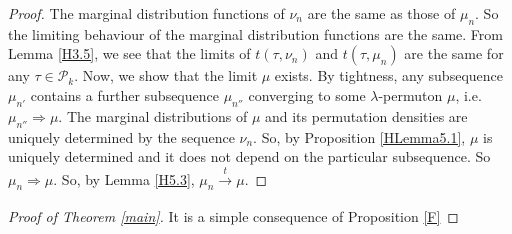 \documentclass[12pt,twoside]{article}
\theoremstyle{definition}
\theoremstyle{remark}
\numberwithin{equation}{section}
\theoremstyle{plain}
\theoremstyle{remark}
\def\PD{{\mathcal P}}                     \def\PDW{{\tilde{\cal P}}}
\def\PD{{\mathcal P}}
\begin{document}
\begin{proof}
The marginal distribution functions of $\nu_n$ are the same as those of $\mu_n$.
So the limiting behaviour of the marginal distribution functions are the same.
From Lemma \ref{H3.5}, we see that the limits of
$t(\tau, \nu_n)$ and  $t(\tau, \mu_n)$ are the same for any $\tau\in \PD_{k}$.
Now, we show that the limit $\mu$ exists.
By tightness, any subsequence $\mu_{n'} $ contains a further subsequence 
$\mu_{n''} $ converging to some $\lambda$-permuton $\mu$, i.e. $\mu_{n''} \Rightarrow \mu$.
The marginal distributions of $\mu$ and its permutation densities are uniquely determined by the
sequence $\nu_n$.
So, by Proposition \ref{HLemma5.1}, $\mu$ is uniquely determined and it does not depend on the
particular subsequence.
So $\mu_{n} \Rightarrow \mu$.
So, by Lemma \ref{H5.3}, $\mu_n \xrightarrow[]{t} \mu$.
\end{proof}
%

\begin{proof}[Proof of Theorem \ref{main}]
It is a simple consequence of Proposition \ref{F}
\end{proof}
%
\end{document}
